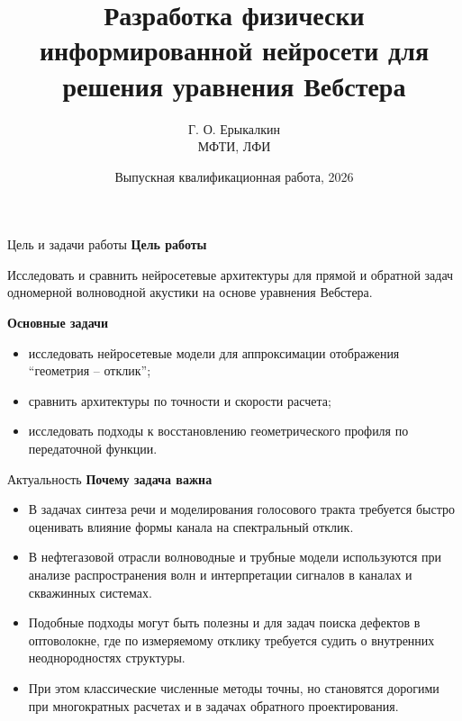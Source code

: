 \documentclass[aspectratio=169,10pt]{beamer}
\title[Нейросетевые модели уравнения Вебстера]{Разработка физически информированной нейросети для решения уравнения Вебстера}
\author{Г. О. Ерыкалкин \\[0.15em] \normalsize МФТИ, ЛФИ}
\institute{{\normalsize Научный руководитель: \href{https://mipt.ru}{К.\ А.~Беклемышев, МФТИ}}}
\date{Выпускная квалификационная работа, 2026}
\begin{document}
\begin{frame}
    \titlepage
    \vspace{-0.5em}
    \begin{center}
        \small 
    \end{center}
\end{frame}

\begin{frame}{Цель и задачи работы}
\textbf{Цель работы}

\begin{block}{}
Исследовать и сравнить нейросетевые архитектуры для прямой и обратной задач одномерной волноводной акустики на основе уравнения Вебстера.
\end{block}

\vspace{0.5em}
\textbf{Основные задачи}
\begin{itemize}
    \item исследовать нейросетевые модели для аппроксимации отображения ``геометрия -- отклик'';
    \item сравнить архитектуры по точности и скорости расчета;
    \item исследовать подходы к восстановлению геометрического профиля по передаточной функции.
\end{itemize}
\end{frame}

\begin{frame}{Актуальность}
\textbf{Почему задача важна}

\begin{itemize}
    \item В задачах синтеза речи и моделирования голосового тракта требуется быстро оценивать влияние формы канала на спектральный отклик.
    \item В нефтегазовой отрасли волноводные и трубные модели используются при анализе распространения волн и интерпретации сигналов в каналах и скважинных системах.
    \item Подобные подходы могут быть полезны и для задач поиска дефектов в оптоволокне, где по измеряемому отклику требуется судить о внутренних неоднородностях структуры.
    \item При этом классические численные методы точны, но становятся дорогими при многократных расчетах и в задачах обратного проектирования.
\end{itemize}
\end{frame}
\end{document}

